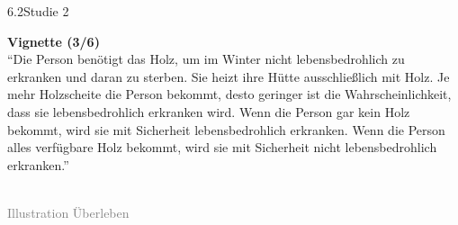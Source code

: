 \documentclass[xcolor=table,9pt,aspectratio=169]{beamer}
\begin{document}
\begin{frame}{\vspace*{10mm}6.2\hspace*{1em}Studie 2}
\begin{multicols}{2}
   \textbf{Vignette (3/6)}\\
   \medskip
   \enquote{Die Person benötigt das Holz, um im Winter nicht lebensbedrohlich zu erkranken und daran zu sterben. Sie heizt ihre Hütte ausschließlich mit Holz. Je mehr Holzscheite die Person bekommt, desto geringer ist die Wahrscheinlichkeit, dass sie lebensbedrohlich erkranken wird. Wenn die Person gar kein Holz bekommt, wird sie mit Sicherheit lebensbedrohlich erkranken. Wenn die Person alles verfügbare Holz bekommt, wird sie mit Sicherheit nicht lebensbedrohlich erkranken.}\\
   \vfill
   \begin{center}
      \\
      \footnotesize{\textcolor{gray}{Illustration Überleben}}
   \end{center}
\end{multicols}
\end{frame}
\end{document}
